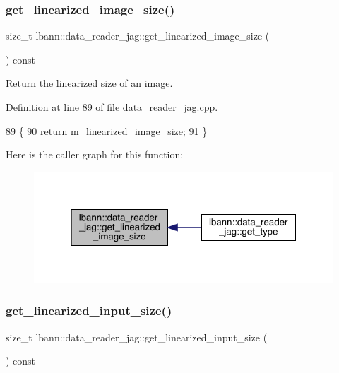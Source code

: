 \subsubsection{\texorpdfstring{get\+\_\+linearized\+\_\+image\+\_\+size()}{get\_linearized\_image\_size()}}
{\footnotesize\ttfamily size\+\_\+t lbann\+::data\+\_\+reader\+\_\+jag\+::get\+\_\+linearized\+\_\+image\+\_\+size (\begin{DoxyParamCaption}{ }\end{DoxyParamCaption}) const}



Return the linearized size of an image. 



Definition at line 89 of file data\+\_\+reader\+\_\+jag.\+cpp.


\begin{DoxyCode}
89                                                         \{
90   \textcolor{keywordflow}{return} \hyperlink{classlbann_1_1data__reader__jag_a7c2aa5f489e7c7a3236c1f6c4a760048}{m\_linearized\_image\_size};
91 \}
\end{DoxyCode}
Here is the caller graph for this function\+:\nopagebreak
\begin{figure}[H]
\begin{center}
\leavevmode
\includegraphics[width=319pt]{classlbann_1_1data__reader__jag_aab3760b1f7824e67f84ce486d3da399f_icgraph}
\end{center}
\end{figure}
\mbox{\label{classlbann_1_1data__reader__jag_a2396088a5c5aac058f89702eea23b86f}} 
\subsubsection{\texorpdfstring{get\+\_\+linearized\+\_\+input\+\_\+size()}{get\_linearized\_input\_size()}}
{\footnotesize\ttfamily size\+\_\+t lbann\+::data\+\_\+reader\+\_\+jag\+::get\+\_\+linearized\+\_\+input\+\_\+size (\begin{DoxyParamCaption}{ }\end{DoxyParamCaption}) const}



